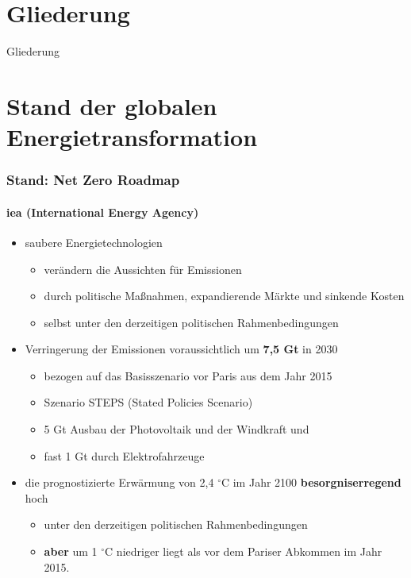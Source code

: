 
\section*{Gliederung}
\begin{frame}{Gliederung}
\tableofcontents
\end{frame}

\section{Stand der globalen Energietransformation}
\label{s.stand}
	\begin{frame}
	\frametitle{Stand: Net Zero Roadmap}
	\framesubtitle{\hspace*{\fill}iea (International Energy Agency)\cite{iea_net_zero2023}}
	
	\begin{itemize}
	 \item saubere Energietechnologien 
		  \begin{itemize}
			  \item verändern die Aussichten für Emissionen 
		    \item durch politische Maßnahmen, expandierende Märkte und sinkende Kosten
				\item selbst unter den derzeitigen politischen Rahmenbedingungen
		\end{itemize}
		\pause
		\item Verringerung der  Emissionen  voraussichtlich um \textbf{7,5 Gt } in 2030    
			 \begin{itemize}
		   	 \item bezogen auf das  Basisszenario vor Paris aus dem Jahr 2015
			   \item Szenario STEPS (Stated Policies Scenario)  
				 \item 5 Gt  Ausbau der Photovoltaik und der Windkraft und 
				 \item fast 1 Gt durch  Elektrofahrzeuge 
			 \end{itemize}
			\pause
			\item  die prognostizierte Erwärmung von 2,4 $^\circ$C im Jahr 2100 \textbf<2->{besorgniserregend} hoch 
			\begin{itemize}
				\item unter den derzeitigen politischen Rahmenbedingungen 
				\item \textbf<2->{aber} um 1 $^\circ$C niedriger liegt als vor dem Pariser Abkommen im Jahr 2015.
     \end{itemize}
	\end{itemize}
		
	\end{frame}	
		
